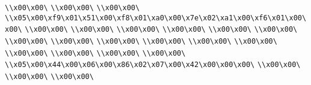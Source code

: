 \verb|\\x00\x00\|\newline
\verb|\\x00\x00\|\newline
\verb|\\x00\x00\|\newline
\verb|\\x05\x00\xf9\x01\x51\x00\xf8\x01\xa0\x00\x7e\x02\xa1\x00\xf6\x01\x00\x00\|\newline
\verb|\\x00\x00\|\newline
\verb|\\x00\x00\|\newline
\verb|\\x00\x00\|\newline
\verb|\\x00\x00\|\newline
\verb|\\x00\x00\|\newline
\verb|\\x00\x00\|\newline
\verb|\\x00\x00\|\newline
\verb|\\x00\x00\|\newline
\verb|\\x00\x00\|\newline
\verb|\\x00\x00\|\newline
\verb|\\x00\x00\|\newline
\verb|\\x00\x00\|\newline
\verb|\\x00\x00\|\newline
\verb|\\x00\x00\|\newline
\verb|\\x00\x00\|\newline
\verb|\\x00\x00\|\newline
\verb|\\x05\x00\x44\x00\x06\x00\x86\x02\x07\x00\x42\x00\x00\x00\|\newline
\verb|\\x00\x00\|\newline
\verb|\\x00\x00\|\newline
\verb|\\x00\x00\|\newline
